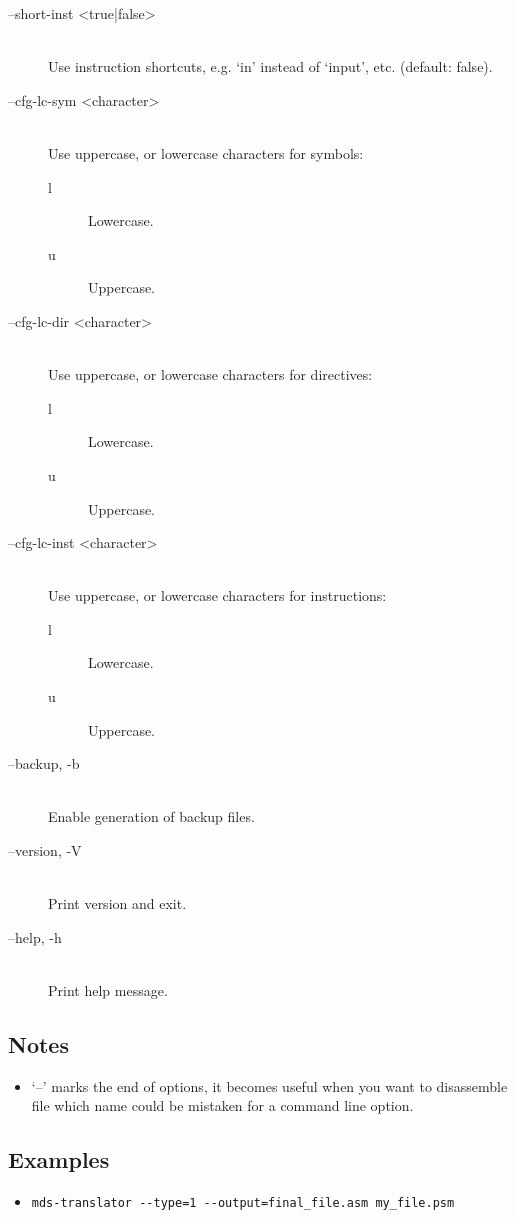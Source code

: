 \begin{description}
            \item[--short-inst <true|false>]~\\
                Use instruction shortcuts, e.g. `in' instead of `input', etc. (default: false).

            \item[--cfg-lc-sym <character>]~\\
                Use uppercase, or lowercase characters for symbols:
                \begin{description}
                    \item [l] Lowercase.
                    \item [u] Uppercase.
                \end{description}

            \item[--cfg-lc-dir <character>]~\\
                Use uppercase, or lowercase characters for directives:
                \begin{description}
                    \item [l] Lowercase.
                    \item [u] Uppercase.
                \end{description}

            \item[--cfg-lc-inst <character>]~\\
                Use uppercase, or lowercase characters for instructions:
                \begin{description}
                    \item [l] Lowercase.
                    \item [u] Uppercase.
                \end{description}

            \item[--backup, -b]~\\
                Enable generation of backup files.

            \item[--version, -V]~\\
                Print version and exit.

            \item[--help, -h]~\\
                Print help message.
        \end{description}

    \subsection{Notes}
        \begin{itemize}
            \item `--' marks the end of options, it becomes useful when you want to disassemble file which name could be mistaken for a command line option.
        \end{itemize}

    \subsection{Examples}
        \begin{itemize}
            \item \verb'mds-translator --type=1 --output=final_file.asm my_file.psm'\\
        \end{itemize}

